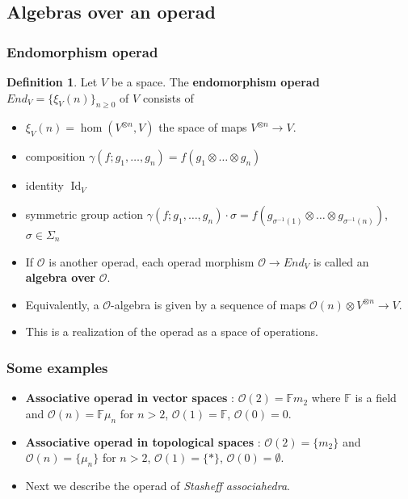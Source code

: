 \documentclass{beamer}
\theoremstyle{definition}
\newtheorem{defi}{Definition}
\begin{document}
\subsection{Algebras over an operad}
\begin{frame}
	\frametitle{Endomorphism operad}
	\begin{defi}
		Let $V$ be a space. The \textbf{endomorphism operad} $End_V = \{ \xi_V(n) \}_{n\geq 0}$ of $V$ consists of
		\begin{itemize}
			\item<1-> $\xi_V(n)=\hom(V^{\otimes n},V)
			$ the space of maps $V^{\otimes n} \to V$.
			\item<2-> composition $\gamma(f; g_1, \dots, g_n)= f(g_1\otimes\dots\otimes g_n)$
			\item<3-> identity $\operatorname{Id}_V$
			\item<4->  symmetric group action $\gamma (f; g_1, \dots, g_n) \cdot \sigma = f (g_{\sigma^{-1}(1)} \otimes \dots \otimes g_{\sigma^{-1}(n)})$,  $\sigma \in \Sigma_n$
		\end{itemize}
	\end{defi}
\end{frame}
\begin{frame}
\begin{itemize}
\item<1->
If $\mathcal{O}$ is another operad, each operad morphism $\mathcal{O} \to End_V$ is called an \textbf{algebra over} $\mathcal{O}$. 
\item<2->Equivalently, a $\mathcal{O}$-algebra is given by a sequence of maps $\mathcal{O}(n)\otimes V^{\otimes n}\to V$.
\item<3-> This is a realization of the operad as a space of operations.
\end{itemize}
\end{frame}

\begin{frame}
\frametitle{Some examples}
\begin{itemize}
\item<1-> \textbf{Associative operad in vector spaces} : $\mathcal{O}(2)=\mathbb{F} m_2$ where $\mathbb{F}$ is a field and $\mathcal{O}(n)=\mathbb{F}\mu_n$ for $n> 2$, $\mathcal{O}(1)=\mathbb{F}$, $\mathcal{O}(0)=0$.  %
\item<2->  \textbf{Associative operad in topological spaces} : $\mathcal{O}(2)=\{m_2\}$ and $\mathcal{O}(n)=\{\mu_n\}$ for $n> 2$, $\mathcal{O}(1)=\{*\}$, $\mathcal{O}(0)=\emptyset$. %

\item<3-> Next we describe the operad of \emph{Stasheff associahedra}.
\end{itemize}

\end{frame}
\end{document}
